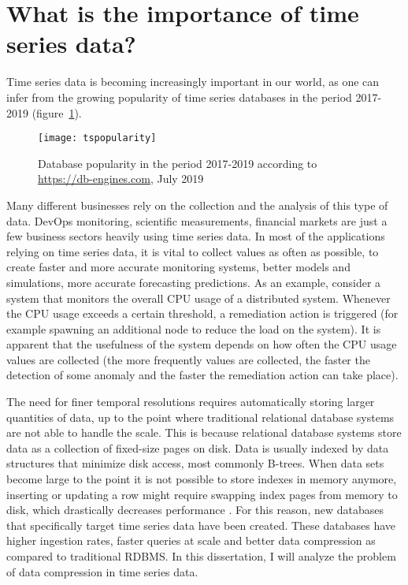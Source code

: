 \section{What is the importance of time series data?}
Time series data is becoming increasingly important in our world, as one can infer from the growing popularity of time series databases in the period 2017-2019 (figure~\ref{tspopularity}).

\begin{figure}
\begin{center}
\texttt{[image: tspopularity]}
\caption[tspopularity]{Database popularity in the period 2017-2019 according to \url{https://db-engines.com}, July 2019}
\label{tspopularity}
\end{center}
\end{figure}

Many different businesses rely on the collection and the analysis of this type of data. DevOps monitoring, scientific measurements, financial markets are just a few business sectors heavily using time series data.  In most of the applications relying on time series data, it is vital to collect values as often as possible, to create faster and more accurate monitoring systems, better models and simulations, more accurate forecasting predictions. As an example, consider a system that monitors the overall CPU usage of a distributed system. Whenever the CPU usage exceeds a certain threshold, a remediation action is triggered (for example spawning an additional node to reduce the load on the system). It is apparent that the usefulness of the system depends on how often the CPU usage values are collected (the more frequently values are collected, the faster the detection of some anomaly and the faster the remediation action can take place).

The need for finer temporal resolutions requires automatically storing larger quantities of data, up to the point where traditional relational database systems are not able to handle the scale. This is because relational database systems store data as a collection of fixed-size pages on disk. Data is usually indexed by data structures that minimize disk access, most commonly B-trees. When data sets become large to the point it is not possible to store indexes in memory anymore, inserting or updating a row might require swapping index pages from memory to disk, which drastically decreases performance \cite{Freedman2017Timeseries}. For this reason, new databases that specifically target time series data have been created. These databases have higher ingestion rates, faster queries at scale and better data compression as compared to traditional RDBMS. In this dissertation, I will analyze the problem of data compression in time series data.

